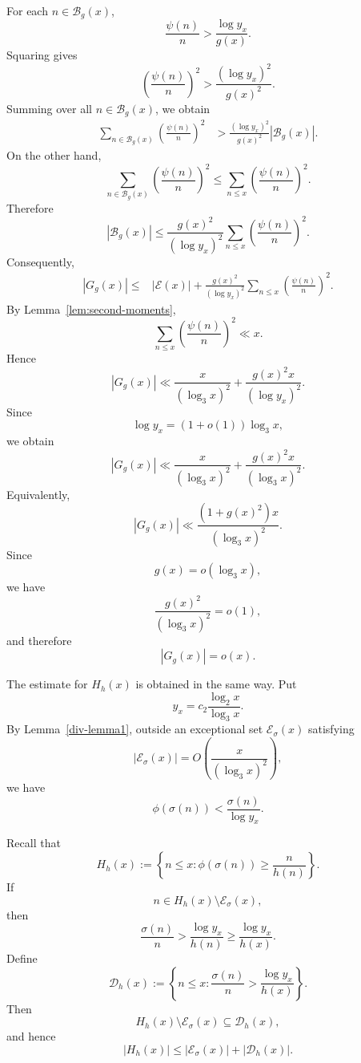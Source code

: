 \documentclass{article}
\theoremstyle{remark}
\begin{document}
For each \(n\in\mathcal B_g(x)\),
\[
        \frac{\psi(n)}n
        >
        \frac{\log y_x}{g(x)}.
\]
Squaring gives
\[
        \left(\frac{\psi(n)}n\right)^2
        >
        \frac{(\log y_x)^2}{g(x)^2}.
\]
Summing over all \(n\in\mathcal B_g(x)\), we obtain
\[
\begin{aligned}
 \sum_{n\in\mathcal B_g(x)}
 \left(\frac{\psi(n)}n\right)^2
 &>
 \frac{(\log y_x)^2}{g(x)^2}
 |\mathcal B_g(x)|.
\end{aligned}
\]
On the other hand,
\[
        \sum_{n\in\mathcal B_g(x)}
        \left(\frac{\psi(n)}n\right)^2
        \leq
        \sum_{n\le x}
        \left(\frac{\psi(n)}n\right)^2.
\]
Therefore
\[
        |\mathcal B_g(x)|
        \leq
        \frac{g(x)^2}{(\log y_x)^2}
        \sum_{n\le x}
        \left(\frac{\psi(n)}n\right)^2.
\]
Consequently,
\[
\begin{aligned}
 |G_g(x)|\le
 &|\mathcal E(x)|
 +
 \frac{g(x)^2}{(\log y_x)^2}
 \sum_{n\le x}
 \left(\frac{\psi(n)}n\right)^2.
\end{aligned}
\]
By Lemma~\ref{lem:second-moments},
\[
        \sum_{n\le x}
        \left(\frac{\psi(n)}n\right)^2
        \ll x.
\]
Hence
\[
        |G_g(x)|
        \ll
        \frac{x}{(\log_3x)^2}
        +
        \frac{g(x)^2x}{(\log y_x)^2}.
\]
Since
\[
        \log y_x=(1+o(1))\log_3x,
\]
we obtain
\[
        |G_g(x)|
        \ll
        \frac{x}{(\log_3x)^2}
        +
        \frac{g(x)^2x}{(\log_3x)^2}.
\]
Equivalently,
\[
        |G_g(x)|
        \ll
        \frac{(1+g(x)^2)x}{(\log_3x)^2}.
\]
Since
\[
        g(x)=o(\log_3x),
\]
we have
\[
        \frac{g(x)^2}{(\log_3x)^2}=o(1),
\]
and therefore
\[
        |G_g(x)|=o(x).
\]

The estimate for \(H_h(x)\) is obtained in the same way. Put
\[
        y_x=c_2\frac{\log_2x}{\log_3x}.
\]
By Lemma~\ref{div-lemma1}, outside an exceptional set
\(\mathcal E_\sigma(x)\) satisfying
\[
        |\mathcal E_\sigma(x)|
        =
        O\left(\frac{x}{(\log_3x)^2}\right),
\]
we have
\[
        \phi(\sigma(n))
        <
        \frac{\sigma(n)}{\log y_x}.
\]

Recall that
\[
        H_h(x)
        :=
        \left\{
        n\le x:
        \phi(\sigma(n))
        \geq
        \frac{n}{h(n)}
        \right\}.
\]
If
\[
        n\in H_h(x)\setminus\mathcal E_\sigma(x),
\]
then
\[
        \frac{\sigma(n)}n
        >
        \frac{\log y_x}{h(n)}
        \geq
        \frac{\log y_x}{h(x)}.
\]
Define
\[
        \mathcal D_h(x)
        :=
        \left\{
        n\le x:
        \frac{\sigma(n)}n
        >
        \frac{\log y_x}{h(x)}
        \right\}.
\]
Then
\[
        H_h(x)\setminus\mathcal E_\sigma(x)
        \subseteq
        \mathcal D_h(x),
\]
and hence
\[
        |H_h(x)|
        \leq
        |\mathcal E_\sigma(x)|
        +
        |\mathcal D_h(x)|.
\]
\end{document}
